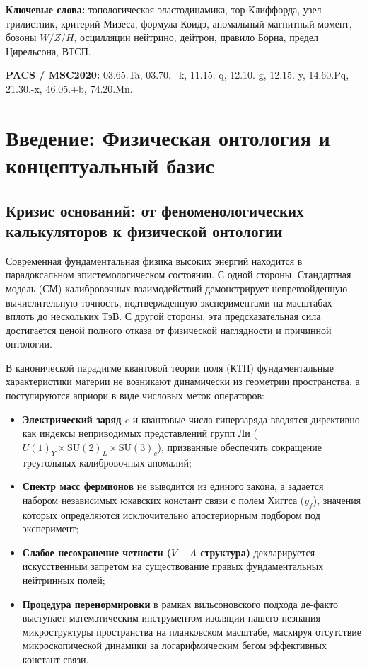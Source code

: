 \documentclass[11pt,a4paper]{article}
\theoremstyle{definition}
\theoremstyle{remark}
\begin{document}
\vspace{2mm}
\noindent\textbf{Ключевые слова:} топологическая эластодинамика, тор Клиффорда, узел-трилистник, критерий Мизеса, формула Коидэ, аномальный магнитный момент, бозоны $W/Z/H$, осцилляции нейтрино, дейтрон, правило Борна, предел Цирельсона, ВТСП.

\vspace{1mm}
\noindent\textbf{PACS / MSC2020:} 03.65.Ta, 03.70.+k, 11.15.-q, 12.10.-g, 12.15.-y, 14.60.Pq, 21.30.-x, 46.05.+b, 74.20.Mn.


\section{Введение: Физическая онтология и концептуальный базис}
\label{sec:introduction}

\subsection{Кризис оснований: от феноменологических калькуляторов к физической онтологии}
Современная фундаментальная физика высоких энергий находится в парадоксальном эпистемологическом состоянии. С одной стороны, Стандартная модель (СМ) калибровочных взаимодействий демонстрирует непревзойденную вычислительную точность, подтвержденную экспериментами на масштабах вплоть до нескольких ТэВ. С другой стороны, эта предсказательная сила достигается ценой полного отказа от физической наглядности и причинной онтологии. 

В канонической парадигме квантовой теории поля (КТП) фундаментальные характеристики материи не возникают динамически из геометрии пространства, а постулируются априори в виде числовых меток операторов:
\begin{itemize}
    \item \textbf{Электрический заряд $e$} и квантовые числа гиперзаряда вводятся директивно как индексы неприводимых представлений групп Ли ($U(1)_Y \times \mathrm{SU}(2)_L \times \mathrm{SU}(3)_c$), призванные обеспечить сокращение треугольных калибровочных аномалий;
    \item \textbf{Спектр масс фермионов} не выводится из единого закона, а задается набором независимых юкавских констант связи с полем Хиггса ($y_f$), значения которых определяются исключительно апостериорным подбором под эксперимент;
    \item \textbf{Слабое несохранение четности ($V-A$ структура)} декларируется искусственным запретом на существование правых фундаментальных нейтринных полей;
    \item \textbf{Процедура перенормировки} в рамках вильсоновского подхода де-факто выступает математическим инструментом изоляции нашего незнания микроструктуры пространства на планковском масштабе, маскируя отсутствие микроскопической динамики за логарифмическим бегом эффективных констант связи.
\end{itemize}
\end{document}
